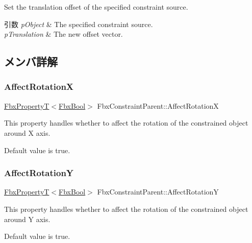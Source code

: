 Set the translation offset of the specified constraint source. 
\begin{DoxyParams}{引数}
{\em p\+Object} & The specified constraint source. \\
\hline
{\em p\+Translation} & The new offset vector. \\
\hline
\end{DoxyParams}


\subsection{メンバ詳解}
\mbox{\label{class_fbx_constraint_parent_ab364319598a6be917048f261160aced4}} 
\subsubsection{\texorpdfstring{Affect\+RotationX}{AffectRotationX}}
{\footnotesize\ttfamily \hyperlink{class_fbx_property_t}{Fbx\+PropertyT}$<$\hyperlink{fbxtypes_8h_a92e0562b2fe33e76a242f498b362262e}{Fbx\+Bool}$>$ Fbx\+Constraint\+Parent\+::\+Affect\+RotationX}

This property handles whether to affect the rotation of the constrained object around X axis.

Default value is true. \mbox{\label{class_fbx_constraint_parent_a50b11f7aca12a04e5048680e0f7af486}} 
\subsubsection{\texorpdfstring{Affect\+RotationY}{AffectRotationY}}
{\footnotesize\ttfamily \hyperlink{class_fbx_property_t}{Fbx\+PropertyT}$<$\hyperlink{fbxtypes_8h_a92e0562b2fe33e76a242f498b362262e}{Fbx\+Bool}$>$ Fbx\+Constraint\+Parent\+::\+Affect\+RotationY}

This property handles whether to affect the rotation of the constrained object around Y axis.

Default value is true. \mbox{\label{class_fbx_constraint_parent_a2b6447babd670eb5023143d1773cdaf8}} 
